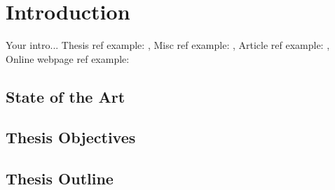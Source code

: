 \chapter{Introduction} \label{chap:introduction}
Your intro... Thesis ref example: \cite{bulin:2016}, Misc ref example: \cite{smidl:pc}, Article ref example: \cite{mcculloch:neuron}, Online webpage ref example: \cite{online:xor_solution}

\section{State of the Art} \label{sec:state_of_the_art}

\section{Thesis Objectives} \label{sec:thesis_objectives}

\section{Thesis Outline} \label{sec:thesis_outline}
